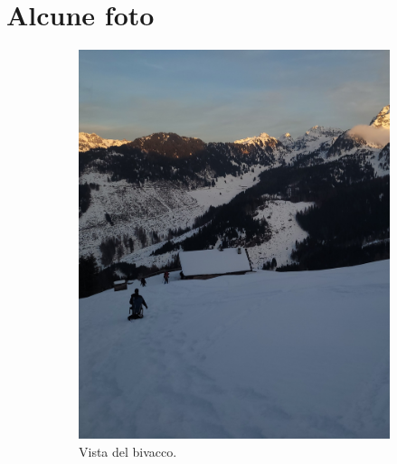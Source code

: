 \documentclass{article}
\begin{document}
\section{Alcune foto}


\begin{figure}[htbp!]
    \centering
    \begin{subfigure}[b]{0.45\textwidth}
        \includegraphics[width=\textwidth]{images/foto_bivacco.jpg}
        \caption{Vista del bivacco.}
    \end{subfigure}
    \hfill
    \begin{subfigure}[b]{0.45\textwidth}

\end{subfigure}
\end{figure}
\end{document}
